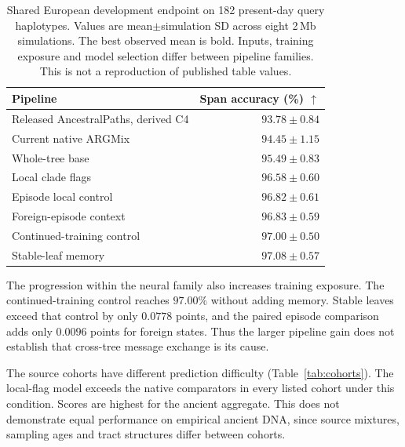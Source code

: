 \documentclass[letterpaper]{article}
\newcommand{\best}[1]{\mathbf{#1}}
\begin{document}
\begin{table}[t]
\centering
\small
\begin{tabular}{@{}lr@{}}
\toprule
Pipeline & Span accuracy (\%) $\uparrow$\\
\midrule
Released AncestralPaths, derived C4 & $93.78\pm0.84$\\
Current native ARGMix & $94.45\pm1.15$\\
Whole-tree base & $95.49\pm0.83$\\
Local clade flags & $96.58\pm0.60$\\
Episode local control & $96.82\pm0.61$\\
Foreign-episode context & $96.83\pm0.59$\\
Continued-training control & $97.00\pm0.50$\\
Stable-leaf memory & $\best{97.08\pm0.57}$\\
\bottomrule
\end{tabular}
\caption{Shared European development endpoint on 182 present-day query haplotypes. Values are mean$\pm$simulation SD across eight 2\,Mb simulations. The best observed mean is bold. Inputs, training exposure and model selection differ between pipeline families. This is not a reproduction of published table values.}
\label{tab:pipeline}
\end{table}

The progression within the neural family also increases training exposure. The continued-training control reaches $97.00\%$ without adding memory. Stable leaves exceed that control by only $0.0778$ points, and the paired episode comparison adds only $0.0096$ points for foreign states. Thus the larger pipeline gain does not establish that cross-tree message exchange is its cause.

The source cohorts have different prediction difficulty (Table~\ref{tab:cohorts}). The local-flag model exceeds the native comparators in every listed cohort under this condition. Scores are highest for the ancient aggregate. This does not demonstrate equal performance on empirical ancient DNA, since source mixtures, sampling ages and tract structures differ between cohorts.
\end{document}
